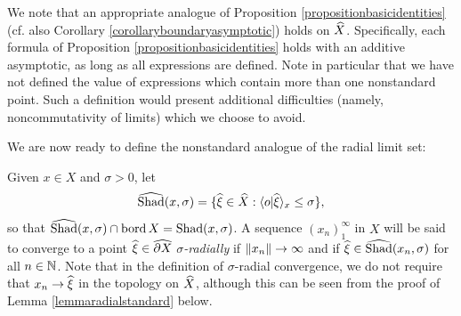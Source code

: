 \begin{remark}
We note that an appropriate analogue of Proposition \ref{propositionbasicidentities} (cf. also Corollary \ref{corollaryboundaryasymptotic}) holds on $\widehat X$. Specifically, each formula of Proposition \ref{propositionbasicidentities} holds with an additive asymptotic, as long as all expressions are defined. Note in particular that we have not defined the value of expressions which contain more than one nonstandard point. Such a definition would present additional difficulties (namely, noncommutativity of limits) which we choose to avoid.
\end{remark}


%
%
%
%

We are now ready to define the nonstandard analogue of the radial limit set:

\begin{definition}
Given $x\in X$ and $\sigma > 0$, let
\[
\what\Shad(x,\sigma) = \{\xihat\in\what X : \lb\zero|\xihat\rb_x\leq\sigma\},
\]
so that $\widehat{\operatorname{Shad}}(x,\sigma)\cap\operatorname{bord} X = \operatorname{Shad}(x,\sigma)$. A sequence $(x_n)_1^\infty$ in $X$ will be said to converge to a point $\xihat\in \what{\del X}$ \emph{$\sigma$-radially} if $\|x_n\|\to\infty$ and if $\xihat\in \what\Shad(x_n,\sigma)$ for all $n\in\N$. Note that in the definition of $\sigma$-radial convergence, we do not require that $x_n\to\xihat$ in the topology on $\widehat X$, although this can be seen from the proof of Lemma \ref{lemmaradialstandard} below.
\end{definition}

